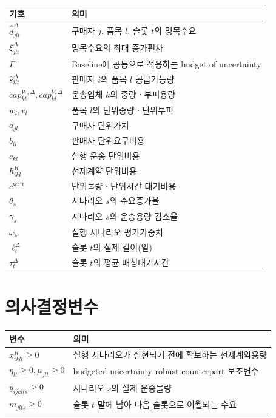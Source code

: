 \documentclass[11pt,a4paper]{article}
\begin{document}
\begin{longtable}{@{}p{}p{}@{}}
\toprule
\textbf{기호} & \textbf{의미} \\
\midrule
$\hat d^\Delta_{jlt}$ & 구매자 $j$, 품목 $l$, 슬롯 $t$의 명목수요 \\
$\xi^\Delta_{jlt}$ & 명목수요의 최대 증가편차 \\
$\Gamma$ & Baseline에 공통으로 적용하는 budget of uncertainty \\
$\hat s^\Delta_{ilt}$ & 판매자 $i$의 품목 $l$ 공급가능량 \\
$cap^{W,\Delta}_{kt},cap^{V,\Delta}_{kt}$ & 운송업체 $k$의 중량ㆍ부피용량 \\
$w_l,v_l$ & 품목 $l$의 단위중량ㆍ단위부피 \\
$a_{jl}$ & 구매자 단위가치 \\
$b_{il}$ & 판매자 단위요구비용 \\
$c_{kl}$ & 실행 운송 단위비용 \\
$h^R_{ikl}$ & 선제계약 단위비용 \\
$c^{\mathrm{wait}}$ & 단위물량ㆍ단위시간 대기비용 \\
$\theta_s$ & 시나리오 $s$의 수요증가율 \\
$\gamma_s$ & 시나리오 $s$의 운송용량 감소율 \\
$\omega_s$ & 실행 시나리오 평가가중치 \\
$\ell_t^\Delta$ & 슬롯 $t$의 실제 길이(일) \\
$\tau_t^\Delta$ & 슬롯 $t$의 평균 매칭대기시간 \\
\bottomrule
\end{longtable}

\section{의사결정변수}

\begin{longtable}{@{}p{}p{}@{}}
\toprule
\textbf{변수} & \textbf{의미} \\
\midrule
$x^R_{iklt}\ge0$ & 실행 시나리오가 실현되기 전에 확보하는 선제계약용량 \\
$\eta_{lt}\ge0,\mu_{jlt}\ge0$ & budgeted uncertainty robust counterpart 보조변수 \\
$y_{ijklts}\ge0$ & 시나리오 $s$의 실제 운송물량 \\
$m_{jlts}\ge0$ & 슬롯 $t$ 말에 남아 다음 슬롯으로 이월되는 수요 \\
\bottomrule
\end{longtable}
\end{document}
